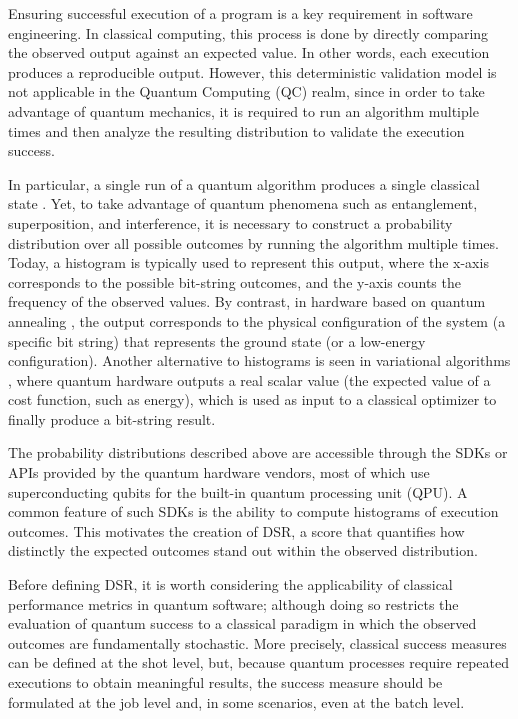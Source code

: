 \documentclass[10pt,conference]{IEEEtran}
\begin{document}
Ensuring successful execution of a program is a key requirement in software engineering. In classical computing, this process is done by directly comparing the observed output against an expected value. In other words, each execution produces a reproducible output. However, this deterministic validation model is not applicable in the Quantum Computing (QC) realm, since in order to take advantage of quantum mechanics, it is required to run an algorithm multiple times and then analyze the resulting distribution to validate the execution success.

In particular, a single run of a quantum algorithm produces a single classical state \cite{nielsenQuantumComputationQuantuma_2010}. Yet, to take advantage of quantum phenomena such as entanglement, superposition, and interference, it is necessary to construct a probability distribution over all possible outcomes by running the algorithm multiple times. Today, a histogram is typically used to represent this output, where the x-axis corresponds to the possible bit-string outcomes, and the y-axis counts the frequency of the observed values. By contrast, in hardware based on quantum annealing \cite{Hauke_2020_2020}, the output corresponds to the physical configuration of the system (a specific bit string) that represents the ground state (or a low-energy configuration). Another alternative to histograms is seen in variational algorithms \cite{McClean_2016_2016}, where quantum hardware outputs a real scalar value (the expected value of a cost function, such as energy), which is used as input to a classical optimizer to finally produce a bit-string result.

The probability distributions described above are accessible through the SDKs or APIs provided by the quantum hardware vendors, most of which use superconducting qubits for the built-in quantum processing unit (QPU). A common feature of such SDKs is the ability to compute histograms of execution outcomes. This motivates the creation of DSR, a score that quantifies how distinctly the expected outcomes stand out within the observed distribution.

Before defining DSR, it is worth considering the applicability of classical performance metrics in quantum software; although doing so restricts the evaluation of quantum success to a classical paradigm in which the observed outcomes are fundamentally stochastic. More precisely, classical success measures can be defined at the shot level, but, because quantum processes require repeated executions to obtain meaningful results, the success measure should be formulated at the job level and, in some scenarios, even at the batch level.
\end{document}
